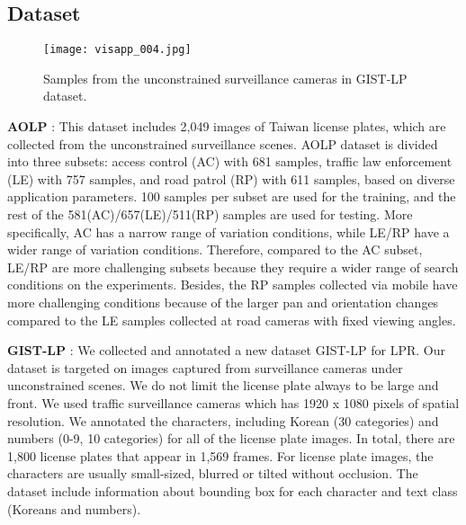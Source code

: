 \documentclass[a4paper,twoside]{article}
\begin{document}
\subsection{Dataset}

\begin{figure*}[t]
    \begin{center}
\texttt{[image: visapp\_004.jpg]}
    \end{center}
       \caption{Samples from the unconstrained surveillance cameras in GIST-LP dataset.}
    \label{fig:long}
    \label{fig:onecol}
    \end{figure*}
    
    \textbf{AOLP} : This dataset\cite{hsu2013application} includes 2,049 images of Taiwan license plates, which are collected from the unconstrained surveillance scenes. AOLP dataset is divided into three subsets: access control (AC) with 681 samples, traffic law enforcement (LE) with 757 samples, and road patrol (RP) with 611 samples, based on diverse application parameters. 100 samples per subset are used for the training, and the rest of the 581(AC)/657(LE)/511(RP) samples are used for testing. More specifically, AC has a narrow range of variation conditions, while LE/RP have a wider range of variation conditions. Therefore, compared to the AC subset, LE/RP are more challenging subsets because they require a wider range of search conditions on the experiments. Besides, the RP samples collected via mobile have more challenging conditions because of the larger pan and orientation changes compared to the LE samples collected at road cameras with fixed viewing angles. 
  
    \textbf{GIST-LP} : We collected and annotated a new dataset GIST-LP for LPR. Our dataset is targeted on images captured from surveillance cameras under unconstrained scenes. We do not limit the license plate always to be large and front. We used traffic surveillance cameras which has 1920 x 1080 pixels of spatial resolution. We annotated the characters, including Korean (30 categories) and numbers (0-9, 10 categories) for all of the license plate images. In total, there are 1,800 license plates that appear in 1,569 frames. For license plate images, the characters are usually small-sized, blurred or tilted without occlusion. The dataset include information about bounding box for each character and text class (Koreans and numbers).
\end{document}
